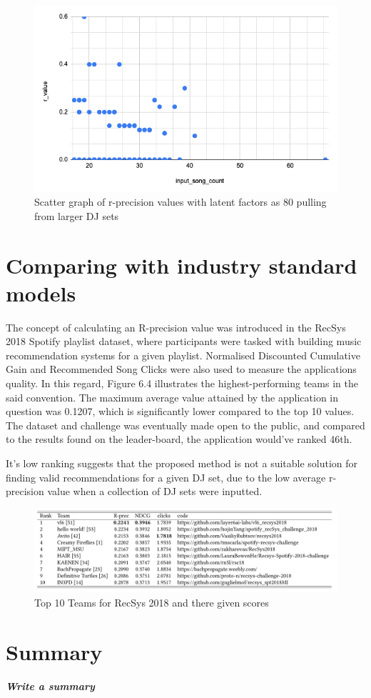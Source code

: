\begin{figure}[H]
	\includegraphics[scale=0.6]{images/80_big_sets}
	\centering
	\caption{Scatter graph of r-precision values with latent factors as 80 pulling from larger DJ sets} 
\end{figure}


\section{Comparing with industry standard models}

	The concept of calculating an R-precision value was introduced in the RecSys 2018 Spotify playlist dataset, where participants were tasked with building music recommendation systems for a given playlist. Normalised Discounted Cumulative Gain and Recommended Song Clicks were also used to measure the applications quality. In this regard, Figure 6.4 illustrates the highest-performing teams in the said convention. The maximum average value attained by the application in question was 0.1207, which is significantly lower compared to the top 10 values. The dataset and challenge was eventually made open to the public, and compared to the results found on the leader-board, the application would've ranked 46th. 

It's low ranking suggests that the proposed method is not a suitable solution for finding valid recommendations for a given DJ set, due to the low average r-precision value when a collection of DJ sets were inputted.
\begin{figure}[H]
	\hspace*{-0.5cm} 
	\includegraphics[scale=0.55]{images/recsys_scores}
	\caption{Top 10 Teams for RecSys 2018 and there given scores} 
\end{figure}

\section{Summary}
\textbf{\textit{Write a summary}}
